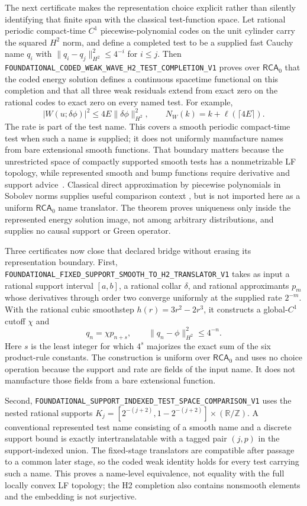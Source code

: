 \documentclass[11pt]{article}
\theoremstyle{definition}
\theoremstyle{remark}
\newcommand{\RCA}{\mathsf{RCA}_{0}}
\newcommand{\cert}[1]{\nolinkurl{#1}}
\begin{document}
The next certificate makes the representation choice explicit rather than
silently identifying that finite span with the classical test-function space.
Let rational periodic compact-time \(C^1\) piecewise-polynomial codes on the
unit cylinder carry the squared \(H^2\) norm, and define a completed test to be
a supplied fast Cauchy name \(q_i\) with
\(\lVert q_i-q_j\rVert_{H^2}^2\leq4^{-i}\) for \(i\leq j\).  Then
\cert{FOUNDATIONAL_CODED_WEAK_WAVE_H2_TEST_COMPLETION_V1} proves over \(\RCA\)
that the coded energy solution defines a continuous spacetime functional on
this completion and that all three weak residuals extend from exact zero on
the rational codes to exact zero on every named test.  For example,
\[
 |W(u;\delta\phi)|^2\leq 4E
       \lVert\delta\phi\rVert_{H^2}^2,
 \qquad N_W(k)=k+\ell(\lceil4E\rceil).
\]
The rate is part of the test name.  This covers a smooth periodic compact-time
test when such a name is supplied; it does not uniformly manufacture names
from bare extensional smooth functions.  That boundary matters because the
unrestricted space of compactly supported smooth tests has a nonmetrizable LF
topology, while represented smooth and bump functions require derivative and
support advice~\cite{PaulySteinberg2018}.  Classical direct approximation by
piecewise polynomials in Sobolev norms supplies useful comparison context
\cite{VanSchaftingen2014}, but is not imported here as a uniform \(\RCA\) name
translator.  The theorem proves uniqueness only inside the represented energy
solution image, not among arbitrary distributions, and supplies no causal
support or Green operator.

Three certificates now close that declared bridge without erasing its
representation boundary.  First,
\cert{FOUNDATIONAL_FIXED_SUPPORT_SMOOTH_TO_H2_TRANSLATOR_V1} takes as input a
rational support interval $[a,b]$, a rational collar $\delta$, and rational
approximants $p_m$ whose derivatives through order two converge uniformly at
the supplied rate $2^{-m}$.  With the rational cubic smoothstep
$h(r)=3r^2-2r^3$, it constructs a global-$C^1$ cutoff $\chi$ and
\[
 q_n=\chi p_{n+s},\qquad
 \lVert q_n-\phi\rVert_{H^2}^2\leq 4^{-n}.
\]
Here $s$ is the least integer for which $4^s$ majorizes the exact sum of the
six product-rule constants.  The construction is uniform over \(\RCA\) and
uses no choice operation because the support and rate are fields of the input
name.  It does not manufacture those fields from a bare extensional function.

Second, \cert{FOUNDATIONAL_SUPPORT_INDEXED_TEST_SPACE_COMPARISON_V1} uses the
nested rational supports
\(K_j=[2^{-(j+2)},1-2^{-(j+2)}]\times(\mathbb R/\mathbb Z)\).
A conventional represented test name consisting of a smooth name and a
discrete support bound is exactly intertranslatable with a tagged pair
$(j,p)$ in the support-indexed union.  The fixed-stage translators are
compatible after passage to a common later stage, so the coded weak identity
holds for every test carrying such a name.  This proves a name-level
equivalence, not equality with the full locally convex LF topology; the H2
completion also contains nonsmooth elements and the embedding is not
surjective.
\end{document}
